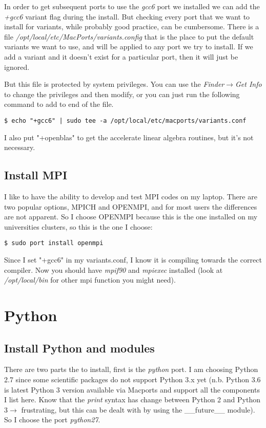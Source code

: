 \documentclass[11pt, A4paper]{article}
\begin{document}
In order to get subsequent ports to use the \textit{gcc6} port we installed we can add the \textit{+gcc6} variant flag during the install. But checking every port that we want to install for variants, while probably good practice, can be cumbersome. There is a file \textit{/opt/local/etc/MacPorts/variants.config} that is the place to put the default variants we want to use, and will be applied to any port we try to install. If we add a variant and it doesn't exist for a particular port, then it will just be ignored.  

But this file is protected by system privileges. You can use the \textit{Finder$\rightarrow$Get Info} to change the privileges and then modify, or you can just run the following command to add to end of the file.
\begin{lstlisting}[style=Bash]
$ echo "+gcc6" | sudo tee -a /opt/local/etc/macports/variants.conf
\end{lstlisting}
I also put "+openblas" to get the accelerate linear algebra routines, but it's not necessary.


\subsection{Install MPI}
I like to have the ability to develop and test MPI codes on my laptop. There are two popular options, MPICH and OPENMPI, and for most users the differences are not apparent. So I choose OPENMPI because this is the one installed on my universities clusters, so this is the one I choose:
\begin{lstlisting}[style=Bash]
$ sudo port install openmpi
\end{lstlisting}
Since I set "+gcc6" in my variants.conf, I know it is compiling towards the correct compiler. Now you should have \textit{mpif90} and \textit{mpiexec} installed (look at \textit{/opt/local/bin} for other mpi function you might need).



%
%
\section{Python}
\subsection{Install Python and modules}
There are two parts the to install, first is the \textit{python} port.  I am choosing Python 2.7 since some scientific packages do not support Python 3.x yet (n.b. Python 3.6 is latest Python 3 version available via Macports and support all the components I list here. Know that the  \textit{print} syntax has change between Python 2 and Python 3$\rightarrow$ frustrating, but this can be dealt with by using the \_\_future\_\_ module). So I choose the port \textit{python27}. 
\end{document}
